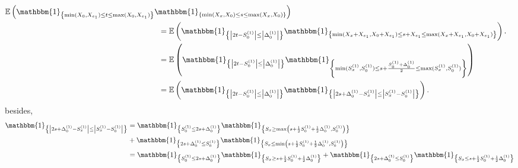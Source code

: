 \documentclass[12pt]{article}
\theoremstyle{Theorem}
\theoremstyle{definition}
\begin{document}
{\small
\begin{align*}
\mathbb{E}\left(\mathbbm{1}_{\left\{\min(X_{\scriptscriptstyle 0}, X_{e_1}) \leq t \leq \max(X_{\scriptscriptstyle 0}, X_{e_1})\right\}}\mathbbm{1}_{\left\{\min(X_{\scriptscriptstyle x}, X_{0}) \leq s \leq \max(X_{\scriptscriptstyle x}, X_{0}) \right\}}\right)\\
& \hspace{-6cm} = \mathbb{E}\left(\mathbbm{1}_{\left\{ \left|2t - S^{\scriptscriptstyle (1)}_{\scriptscriptstyle 0}\right| \leq \left|\Delta^{\scriptscriptstyle (1)}_{\scriptscriptstyle 0}\right|\right\}}\mathbbm{1}_{\left\{\min(X_{\scriptscriptstyle x}+ X_{e_1}, X_{0} + X_{e_1}) \leq s + X_{e_1}\leq \max(X_{\scriptscriptstyle x} + X_{e_1}, X_{0} + X_{e_1}) \right\}}\right). \\
& \hspace{-6cm} = \mathbb{E}\left(\mathbbm{1}_{\left\{ \left|2t - S^{\scriptscriptstyle (1)}_{\scriptscriptstyle 0}\right| \leq \left|\Delta^{\scriptscriptstyle (1)}_{\scriptscriptstyle 0}\right|\right\}}\mathbbm{1}_{\left\{\min(S^{(1)}_{x}, S^{(1)}_{0}) \leq s + \frac{S^{(1)}_{0} + \Delta^{(1)}_{0}}{2}\leq \max(S^{(1)}_{x}, S^{(1)}_{0}) \right\}}\right) \\
& \hspace{-6cm} = \mathbb{E}\left(\mathbbm{1}_{\left\{ \left|2t - S^{\scriptscriptstyle (1)}_{\scriptscriptstyle 0}\right| \leq \left|\Delta^{\scriptscriptstyle (1)}_{\scriptscriptstyle 0}\right|\right\}}\mathbbm{1}_{\left\{ \left|2s + \Delta^{(1)}_{0} -  S^{\scriptscriptstyle (1)}_{x}  \right| \leq \left|S^{\scriptscriptstyle (1)}_{x} - S^{\scriptscriptstyle (1)}_{0}\right|\right\}}\right). 
\end{align*}}
besides, 
\begin{align*}
\mathbbm{1}_{\left\{ \left|2s + \Delta^{(1)}_{0} -  S^{\scriptscriptstyle (1)}_{x}  \right| \leq \left|S^{\scriptscriptstyle (1)}_{x} - S^{\scriptscriptstyle (1)}_{0}\right|\right\}} &= \mathbbm{1}_{\left\{  S^{\scriptscriptstyle (1)}_{0} \leq 2s + \Delta^{(1)}_{0}\right\}} \mathbbm{1}_{\left\{ S_{x} \geq  \max\left(s+ \frac{1}{2}S^{\scriptscriptstyle (1)}_{0} + \frac{1}{2}\Delta^{\scriptscriptstyle (1)}_{0}, S^{\scriptscriptstyle (1)}_{0}\right) \right\}} \\
& + \mathbbm{1}_{\left\{  2s + \Delta^{(1)}_{0} \leq S^{\scriptscriptstyle (1)}_{0} \right\}} \mathbbm{1}_{\left\{ S_{x} \leq  \min\left(s+ \frac{1}{2}S^{\scriptscriptstyle (1)}_{0} + \frac{1}{2}\Delta^{\scriptscriptstyle (1)}_{0}, S^{\scriptscriptstyle (1)}_{0}\right) \right\}} \\
&= \mathbbm{1}_{\left\{  S^{\scriptscriptstyle (1)}_{0} \leq 2s + \Delta^{(1)}_{0}\right\}} \mathbbm{1}_{\left\{ S_{x} \geq s+ \frac{1}{2}S^{\scriptscriptstyle (1)}_{0} + \frac{1}{2}\Delta^{\scriptscriptstyle (1)}_{0}\right\}} + \mathbbm{1}_{\left\{  2s + \Delta^{(1)}_{0} \leq S^{\scriptscriptstyle (1)}_{0} \right\}} \mathbbm{1}_{\left\{ S_{x} \leq  s+ \frac{1}{2}S^{\scriptscriptstyle (1)}_{0} + \frac{1}{2}\Delta^{\scriptscriptstyle (1)}_{0} \right\}} \\
\end{align*} 
\end{document}
